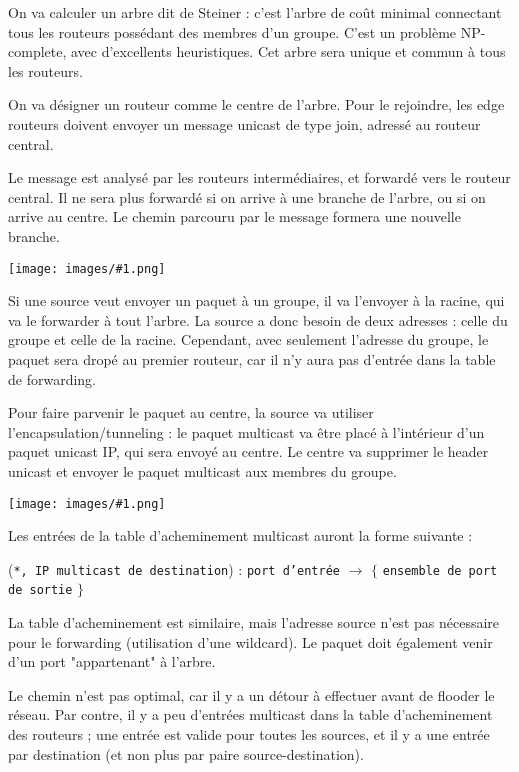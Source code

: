\documentclass[10pt,a4paper]{report}
\newcommand{\dessin}[1]{\begin{center}\texttt{[image: images/\#1.png]}\end{center}}
\begin{document}
		
		On va calculer un arbre dit de Steiner : c'est l'arbre de coût minimal connectant tous les routeurs possédant des membres d'un groupe. C'est un problème NP-complete, avec d'excellents heuristiques. Cet arbre sera unique et commun à tous les routeurs.
		
		On va désigner un routeur comme le centre de l'arbre. Pour le rejoindre, les edge routeurs doivent envoyer un message unicast de type join, adressé au routeur central.
		
		Le message est analysé par les routeurs intermédiaires, et forwardé vers le routeur central. Il ne sera plus forwardé si on arrive à une branche de l'arbre, ou si on arrive au centre. Le chemin parcouru par le message formera une nouvelle branche.
		
		\dessin{136}
				
		Si une source veut envoyer un paquet à un groupe, il va l'envoyer à la racine, qui va le forwarder à tout l'arbre. La source a donc besoin de deux adresses : celle du groupe et celle de la racine. Cependant, avec seulement l'adresse du groupe, le paquet sera dropé au premier routeur, car il n'y aura pas d'entrée dans la table de forwarding.
		
		
		Pour faire parvenir le paquet au centre, la source va utiliser l'encapsulation/tunneling : le paquet multicast va être placé à l'intérieur d'un paquet unicast IP, qui sera envoyé au centre. Le centre va supprimer le header unicast et envoyer le paquet multicast aux membres du groupe.
		
		\dessin{128}
		
		Les entrées de la table d'acheminement multicast auront la forme suivante :
		
		\begin{center}
	(\texttt{*, IP multicast de destination}) : \texttt{port d'entrée} $\rightarrow$ $\lbrace$ \texttt{ensemble de port de sortie} $\rbrace$
\end{center}
		
		La table d'acheminement est similaire, mais l'adresse source n'est pas nécessaire pour le forwarding (utilisation d'une wildcard). Le paquet doit également venir d'un port "appartenant" à l'arbre.
		
		Le chemin n'est pas optimal, car il y a un détour à effectuer avant de flooder le réseau. Par contre, il y a peu d'entrées multicast dans la table d'acheminement des routeurs ; une entrée est valide pour toutes les sources, et il y a une entrée par destination (et non plus par paire source-destination).
		
\end{document}
